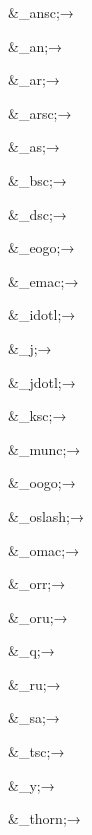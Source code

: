 \begin{multicols}{4}
\color{RViolet}%
\&{\textcompwordmark}\_ansc;\hfill→\hfill{}

\&{\textcompwordmark}\_an;\hfill→\hfill{}

\&{\textcompwordmark}\_ar;\hfill→\hfill{}

\&{\textcompwordmark}\_arsc;\hfill→\hfill{}

\&\_{\textcompwordmark}as;\hfill→\hfill{}

\&{\textcompwordmark}\_bsc;\hfill→\hfill{}

\&{\textcompwordmark}\_dsc;\hfill→\hfill{}

\&{\textcompwordmark}\_eogo;\hfill→\hfill{}

\&{\textcompwordmark}\_emac;\hfill→\hfill{}

\&\_{\textcompwordmark}idotl;\hfill→\hfill{}

\&\_{\textcompwordmark}j;\hfill→\hfill{}

\&\_{\textcompwordmark}jdotl;\hfill→\hfill{}

\&\_{\textcompwordmark}ksc;\hfill→\hfill{}

{\jCond\&\_{\textcompwordmark}munc;\hfill→\hfill{}}

\&\_{\textcompwordmark}oogo;\hfill→\hfill{}

{\jCond\&\_{\textcompwordmark}oslash;\hfill→\hfill{}}

\&\_{\textcompwordmark}omac;\hfill→\hfill{}

\&\_{\textcompwordmark}orr;\hfill→\hfill{}

\&\_{\textcompwordmark}oru;\hfill→\hfill{}

\&\_{\textcompwordmark}q;\hfill→\hfill{}

\&\_{\textcompwordmark}ru;\hfill→\hfill{}

\&\_{\textcompwordmark}sa;\hfill→\hfill{}

\&\_{\textcompwordmark}tsc;\hfill→\hfill{}

\&\_{\textcompwordmark}y;\hfill→\hfill{}

{\jCond\&\_{\textcompwordmark}thorn;\hfill→\hfill{}}
\end{multicols}

